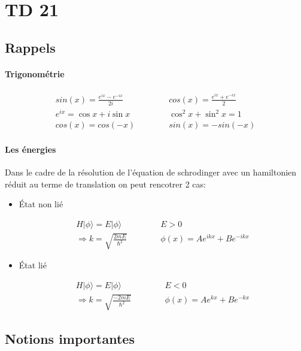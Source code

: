 \section{TD 21}



\subsection{Rappels}


\paragraph{Trigonométrie}

\begin{align*}
	sin(x)= \frac{e^{ix}-e^{-ix}}{2i} &&&&& cos(x)=\frac{e^{ix}+e^{-ix}}{2} \\
	e^{ix}= \cos x+i\sin x &&&&& \cos^2 x+\sin^2 x=1 \\
	cos(x)=cos(-x) &&&&& sin(x)=-sin(-x)
\end{align*}


\paragraph{Les énergies}

Dans le cadre de la résolution de l'équation de schrodinger avec un hamiltonien réduit au terme de translation on peut rencotrer 2 cas:
\begin{itemize}

	\item État non lié 

	\begin{align*}
		H|\phi \rangle = E |\phi \rangle &&&&& E>0 \\
		\Rightarrow k=\sqrt{\frac{2mE}{\hbar^2}} &&&&& \phi (x) =Ae^{ikx}+Be^{-ikx}
	\end{align*}

	\item État lié

	\begin{align*}
		H|\phi \rangle = E |\phi \rangle &&&&& E<0 \\
		\Rightarrow k=\sqrt{\frac{-2mE}{\hbar^2}} &&&&& \phi (x) =Ae^{kx}+Be^{-kx}
	\end{align*}

\end{itemize}


\subsection{Notions importantes}


